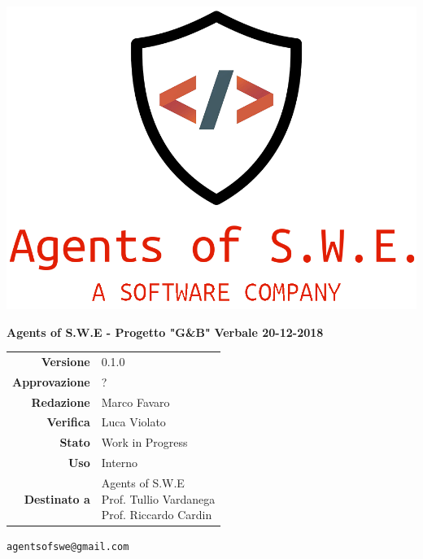 


\begin{titlepage}
\thispagestyle{empty}

\begin{center}

\includegraphics[scale=0.3]{./images/logo.png} 




\large \textbf{Agents of S.W.E - Progetto "G\&B"}
\vfill
\Huge \textbf{Verbale 20-12-2018}
\vfill
\large
\renewcommand{\arraystretch}{1.3}
\begin{tabular}{r|l}
\textbf{Versione} & 0.1.0\\
\textbf{Approvazione} & ?\\
\textbf{Redazione} & \parbox[t]{5cm}{Marco Favaro}\\
\textbf{Verifica} & \parbox[t]{5cm}{Luca Violato}\\
\textbf{Stato} & Work in Progress\\
\textbf{Uso} & Interno\\
\textbf{Destinato a} & \parbox[t]{5cm}{Agents of S.W.E \\Prof. Tullio Vardanega\\Prof. Riccardo Cardin}
\end{tabular}
\vfill
\small
\texttt{agentsofswe@gmail.com}
\end{center}
\end{titlepage}

\pagebreak



\pagebreak








